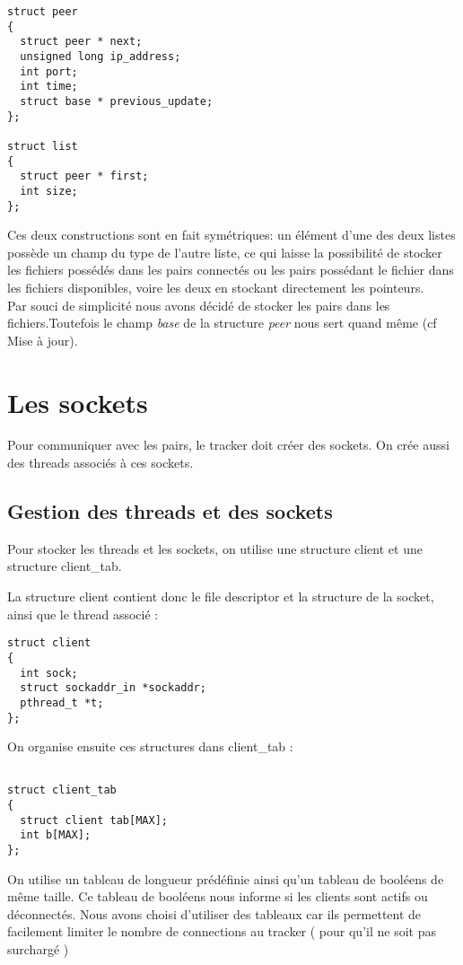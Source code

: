 \begin{verbatim}
struct peer
{
  struct peer * next;
  unsigned long ip_address;
  int port;
  int time;
  struct base * previous_update;
};

struct list
{
  struct peer * first;
  int size;
};
\end{verbatim}

Ces deux constructions sont en fait symétriques: un élément d'une des deux listes possède un champ du type de l'autre liste, ce qui laisse la possibilité de stocker les fichiers possédés dans les pairs connectés ou les pairs possédant le fichier dans les fichiers disponibles, voire les deux en stockant directement les pointeurs.\\ 
Par souci de simplicité nous avons décidé de stocker les pairs dans les fichiers.Toutefois le champ \textit{base} de la structure \textit{peer} nous sert quand même (cf Mise à jour).


\section{Les sockets}

Pour communiquer avec les pairs, le tracker doit créer des sockets. On crée aussi des threads associés à ces sockets.
\subsection{Gestion des threads et des sockets}
Pour stocker les threads et les sockets, on utilise une structure client et une structure client\_tab.

La structure client contient donc le file descriptor et la structure de la socket, ainsi que le thread associé :
\begin{verbatim}
struct client
{
  int sock;
  struct sockaddr_in *sockaddr;
  pthread_t *t; 
};
\end{verbatim}
On organise ensuite ces structures dans client\_tab :
\begin{verbatim}

struct client_tab
{
  struct client tab[MAX];
  int b[MAX];
};
\end{verbatim}
On utilise un tableau de longueur prédéfinie ainsi qu'un tableau de booléens de même taille. Ce tableau de booléens nous informe si les clients sont actifs ou déconnectés.
Nous avons choisi d'utiliser des tableaux car ils permettent de facilement limiter le nombre de connections au tracker ( pour qu'il ne soit pas surchargé )

